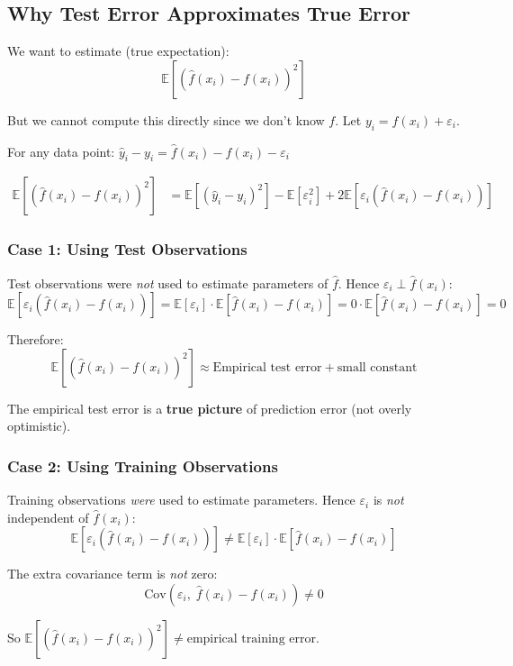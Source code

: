 \documentclass[12pt,a4paper]{article}
\newcommand{\E}{\mathbb{E}}
\newcommand{\Cov}{\mathrm{Cov}}
\begin{document}
\subsection{Why Test Error Approximates True Error}

We want to estimate (true expectation):
\[
  \E\!\left[(\hat{f}(x_i) - f(x_i))^2\right]
\]

But we cannot compute this directly since we don't know $f$. Let $y_i = f(x_i) + \varepsilon_i$.

For any data point: $\hat{y}_i - y_i = \hat{f}(x_i) - f(x_i) - \varepsilon_i$

\begin{align*}
  \E[(\hat{f}(x_i) - f(x_i))^2]
  &= \E[(\hat{y}_i - y_i)^2] - \E[\varepsilon_i^2]
    + 2\E[\varepsilon_i(\hat{f}(x_i) - f(x_i))]
\end{align*}

\subsubsection{Case 1: Using Test Observations}

Test observations were \emph{not} used to estimate parameters of $\hat{f}$. Hence $\varepsilon_i \perp \hat{f}(x_i)$:
\[
  \E[\varepsilon_i(\hat{f}(x_i) - f(x_i))]
  = \E[\varepsilon_i]\cdot\E[\hat{f}(x_i) - f(x_i)]
  = 0 \cdot \E[\hat{f}(x_i) - f(x_i)]
  = 0
\]

Therefore:
\[
  \boxed{
    \E[(\hat{f}(x_i) - f(x_i))^2]
    \approx \text{Empirical test error} + \text{small constant}
  }
\]

The empirical test error is a \textbf{true picture} of prediction error (not overly optimistic).

\subsubsection{Case 2: Using Training Observations}

Training observations \emph{were} used to estimate parameters. Hence $\varepsilon_i$ is \emph{not} independent of $\hat{f}(x_i)$:
\[
  \E[\varepsilon_i(\hat{f}(x_i) - f(x_i))]
  \neq \E[\varepsilon_i]\cdot\E[\hat{f}(x_i) - f(x_i)]
\]

The extra covariance term is \emph{not} zero:
\[
  \Cov(\varepsilon_i,\; \hat{f}(x_i) - f(x_i)) \neq 0
\]

So $\E[(\hat{f}(x_i)-f(x_i))^2] \neq \text{empirical training error}$.
\end{document}
